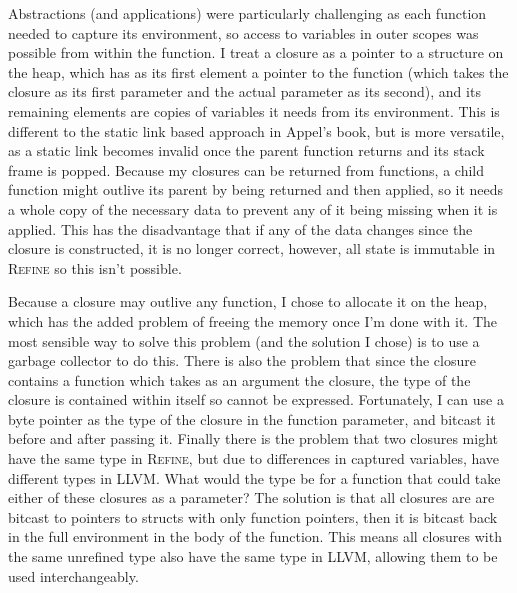 Abstractions (and applications) were particularly challenging as each function needed to capture its
environment, so access to variables in outer scopes was possible from within the function.
I treat a closure as a pointer to a structure on the heap, which has as its first element a pointer
to the function (which takes the closure as its first parameter and the actual parameter as its second),
and its remaining elements are copies of variables it needs from its environment.
This is different to the static link based approach in Appel's book, but is more versatile, as a
static link becomes invalid once the parent function returns and its stack frame is popped.
Because my closures can be returned from functions, a child function might outlive its parent by being
returned and then applied, so it needs a whole copy of the necessary data to prevent any of it being
missing when it is applied.
This has the disadvantage that if any of the data changes since the closure is constructed, it is no longer
correct, however, all state is immutable in \textsc{Refine} so this isn't possible.

Because a closure may outlive any function, I chose to allocate it on the heap, which has the added problem
of freeing the memory once I'm done with it.
The most sensible way to solve this problem (and the solution I chose) is to use a garbage collector to do this.
There is also the problem that since the closure contains a function which takes as an argument the closure,
the type of the closure is contained within itself so cannot be expressed.
Fortunately, I can use a byte pointer as the type of the closure in the function parameter, and bitcast it
before and after passing it.
Finally there is the problem that two closures might have the same type in \textsc{Refine}, but due to differences
in captured variables, have different types in LLVM.
What would the type be for a function that could take either of these closures as a parameter?
The solution is that all closures are are bitcast to pointers to structs with only function pointers,
then it is bitcast back in the full environment in the body of the function.
This means all closures with the same unrefined type also have the same type in LLVM, allowing them
to be used interchangeably.

